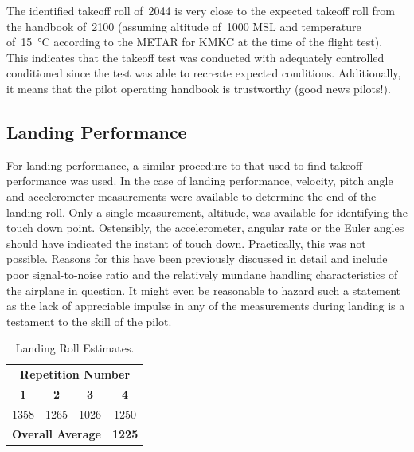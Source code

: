 \documentclass[conf]{new-aiaa}
\begin{document}
The identified takeoff roll of~\SI{2044}{\foot} is very close to the expected takeoff roll from the handbook of~\SI{2100}{\foot} (assuming altitude of~\SI{1000}{\foot} MSL and temperature of~\SI{15}{\celsius} according to the METAR for KMKC at the time of the flight test). This indicates that the takeoff test was conducted with adequately controlled conditioned since the test was able to recreate expected conditions. Additionally, it means that the pilot operating handbook is trustworthy (good news pilots!).

\subsection{Landing Performance}

For landing performance, a similar procedure to that used to find takeoff performance was used. In the case of landing performance, velocity, pitch angle and accelerometer measurements were available to determine the end of the landing roll. Only a single measurement, altitude, was available for identifying the touch down point. Ostensibly, the accelerometer, angular rate or the Euler angles should have indicated the instant of touch down. Practically, this was not possible. Reasons for this have been previously discussed in detail and include poor signal-to-noise ratio and the relatively mundane handling characteristics of the airplane in question. It might even be reasonable to hazard such a statement as the lack of appreciable impulse in any of the measurements during landing is a testament to the skill of the pilot.

\begin{table}[htp!]
\centering
\caption{Landing Roll Estimates.}
\label{takeofftable}
\begin{tabular}{ c | c | c | c }
	\multicolumn{4}{c}{\textbf{Repetition Number}}										\\
	\textbf{1} & \textbf{2} & \textbf{3} & \textbf{4}									\\
	\hline
	\SI{1358}{\foot} & \SI{1265}{\foot} & \SI{1026}{\foot} & \SI{1250}{\foot}			\\
	\hline
	\hline
	\multicolumn{3}{c}{\textbf{Overall Average}} & \textbf{\SI[detect-weight=true]{1225}{\foot}}	\\
	\hline
\end{tabular}
\end{table}
\end{document}
